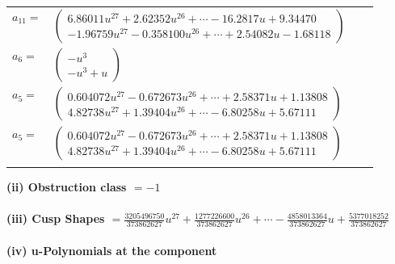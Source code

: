 \documentclass[1p]{elsarticle_modified}
\theoremstyle{definition}
\begin{document}
\begin{tabular}{m{7pt} m{180pt} m{7pt} m{180pt} }
\flushright $a_{11}=$&$\begin{pmatrix}6.86011 u^{27}+2.62352 u^{26}+\cdots-16.2817 u+9.34470\\-1.96759 u^{27}-0.358100 u^{26}+\cdots+2.54082 u-1.68118\end{pmatrix}$ \\
\flushright $a_{6}=$&$\begin{pmatrix}- u^3\\- u^3+u\end{pmatrix}$ \\
\flushright $a_{5}=$&$\begin{pmatrix}0.604072 u^{27}-0.672673 u^{26}+\cdots+2.58371 u+1.13808\\4.82738 u^{27}+1.39404 u^{26}+\cdots-6.80258 u+5.67111\end{pmatrix}$\\ \flushright $a_{5}=$&$\begin{pmatrix}0.604072 u^{27}-0.672673 u^{26}+\cdots+2.58371 u+1.13808\\4.82738 u^{27}+1.39404 u^{26}+\cdots-6.80258 u+5.67111\end{pmatrix}$\\&\end{tabular}
\flushleft \textbf{(ii) Obstruction class $= -1$}\\~\\
\flushleft \textbf{(iii) Cusp Shapes $= \frac{3205496750}{373862627} u^{27}+\frac{1277226600}{373862627} u^{26}+\cdots-\frac{4858013364}{373862627} u+\frac{5377018252}{373862627}$}\\~\\
\newpage\renewcommand{\arraystretch}{1}
\flushleft \textbf{(iv) u-Polynomials at the component}\newline \\
\end{document}
